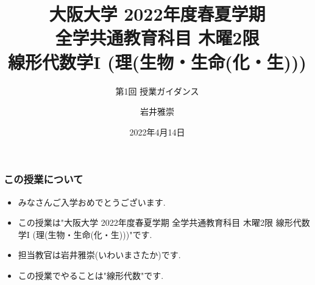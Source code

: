\documentclass[11pt,dvipdfmx]{beamer}
\title[2022年度春夏学期 木曜2限  線形代数学I]{大阪大学 2022年度春夏学期 \\ 全学共通教育科目 木曜2限  \\ 線形代数学I (理(生物・生命(化・生)))}
\subtitle{第1回 授業ガイダンス}
\author[岩井雅崇]{岩井雅崇}
\institute[大阪大学]{大阪大学}
\date{2022年4月14日}  %
\theoremstyle{definition}
\theoremstyle{remark}
\begin{document}

\begin{frame}  %
 \titlepage    %
\end{frame}





\section{ }
\begin{frame}
\frametitle{この授業について}
 \begin{itemize}

\item みなさんご入学おめでとうございます. 
 \item この授業は"大阪大学 2022年度春夏学期 全学共通教育科目 木曜2限 線形代数学I (理(生物・生命(化・生)))"です.
 \item 担当教官は岩井雅崇(いわいまさたか)です.
 \item この授業でやることは"線形代数"です.
 
 \end{itemize}
\end{frame}
\end{document}
